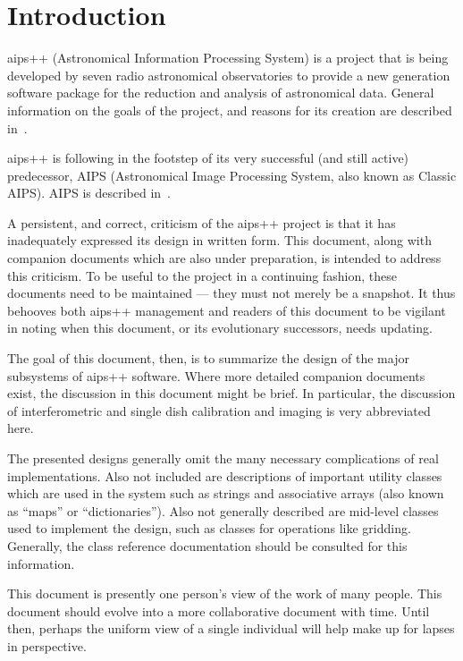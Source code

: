 \section{Introduction}

{\sc aips++} (Astronomical Information Processing System) is a project
that is being developed by seven radio astronomical observatories to
provide a new generation software package for the reduction and
analysis of astronomical data. General information on the goals of the
project, and reasons for its creation are described
in~\cite{croes:aips}. 

{\sc aips++} is following in the footstep of its very successful (and
still active) predecessor, AIPS (Astronomical Image Processing System,
also known as Classic AIPS). AIPS is described in~\cite{bg:AIPS}.

A persistent, and correct, criticism of the {\sc aips++} project is
that it has inadequately expressed its design in written form. This
document, along with companion documents which are also under
preparation, is intended to address this criticism. To be useful to
the project in a continuing fashion, these documents need to be
maintained --- they must not merely be a snapshot. It thus behooves
both {\sc aips++} management and readers of this document to be
vigilant in noting when this document, or its evolutionary successors,
needs updating.

The goal of this document, then, is to summarize the design of the
major subsystems of {\sc aips++} software. Where more detailed
companion documents exist, the discussion in this document might be
brief. In particular, the discussion of interferometric and single
dish calibration and imaging is very abbreviated here.

The presented designs generally omit the many necessary complications
of real implementations. Also not included are descriptions of
important utility classes which are used in the system such as
strings and associative arrays (also known as ``maps'' or
``dictionaries''). Also not generally described are mid-level classes
used to implement the design, such as classes for operations like
gridding.  Generally, the class reference documentation should be
consulted for this information.

This document is presently one person's view of the work of many
people. This document should evolve into a more collaborative document
with time. Until then, perhaps the uniform view of a single individual
will help make up for lapses in perspective.

